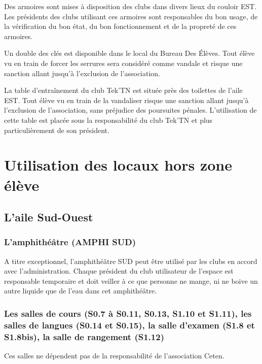 \documentclass{article} %
\begin{document}
				Des armoires sont mises à disposition des clubs dans divers
				lieux du couloir EST\@. Les présidents des clubs utilisant ces
				armoires sont responsables du bon usage, de la vérification du
				bon état, du bon fonctionnement et de la propreté de ces
				armoires. 

				Un double des clés est disponible dans le local du Bureau Des
				Élèves. Tout élève vu en train de forcer les serrures sera
				considéré comme vandale et risque une sanction allant jusqu’à
				l’exclusion de l’association.

				La table d'entraînement du club Tek’TN est située près des
				toilettes de l’aile EST\@. Tout élève vu en train de la
				vandaliser risque une sanction allant jusqu’à l’exclusion de
				l’association, sans préjudice des poursuites pénales.
				L’utilisation de cette table est placée sous la responsabilité
				du club Tek’TN et plus particulièrement de son président.

	\section{Utilisation des locaux hors zone élève}
\label{sec:locaux_nonest}

		\subsection{L’aile Sud-Ouest}

			\subsubsection{L’amphithéâtre (AMPHI SUD)}

				A titre exceptionnel, l’amphithéâtre SUD peut être utilisé par
				les clubs en accord avec l’administration. Chaque président du
				club utilisateur de l’espace est responsable temporaire et doit
				veiller à ce que personne ne mange, ni ne boive un autre
				liquide que de l’eau dans cet amphithéâtre.

			\subsubsection{Les salles de cours (S0.7 à S0.11, S0.13, S1.10 et
			S1.11), les salles de langues (S0.14 et S0.15), la salle d’examen
			(S1.8 et S1.8bis), la salle de rangement (S1.12)}

				Ces salles ne dépendent pas de la responsabilité de
				l'association Ceten.
\end{document}
